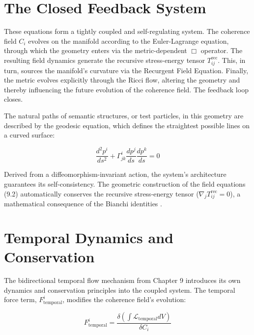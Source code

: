 
\section{The Closed Feedback System}
\label{sec:the_closed_feedback_system}

These equations form a tightly coupled and self-regulating system. The coherence field \(C_i\) evolves on the manifold according to the Euler-Lagrange equation, through which the geometry enters via the metric-dependent \(\Box\) operator. The resulting field dynamics generate the recursive stress-energy tensor \(T^{\text{rec}}_{ij}\). This, in turn, sources the manifold's curvature via the Recurgent Field Equation. Finally, the metric evolves explicitly through the Ricci flow, altering the geometry and thereby influencing the future evolution of the coherence field. The feedback loop closes.

The natural paths of semantic structures, or test particles, in this geometry are described by the geodesic equation, which defines the straightest possible lines on a curved surface:

\begin{equation}
\frac{d^2 p^i}{ds^2} + \Gamma^i_{jk} \frac{dp^j}{ds} \frac{dp^k}{ds} = 0
\end{equation}

Derived from a diffeomorphism-invariant action, the system's architecture guarantees its self-consistency. The geometric construction of the field equations (9.2) automatically conserves the recursive stress-energy tensor ($\nabla_j T^{\text{rec}}_{ij} = 0$), a mathematical consequence of the Bianchi identities \autocite{Bianchi1902}.


\section{Temporal Dynamics and Conservation}
\label{sec:temporal_dynamics_and_conservation}

The bidirectional temporal flow mechanism from Chapter 9 introduces its own dynamics and conservation principles into the coupled system. The temporal force term, \(F^i_{\text{temporal}}\), modifies the coherence field's evolution:

\begin{equation}
F^i_{\text{temporal}} = \frac{\delta(\int \mathcal{L}_{\text{temporal}} dV)}{\delta C_i}
\end{equation}

